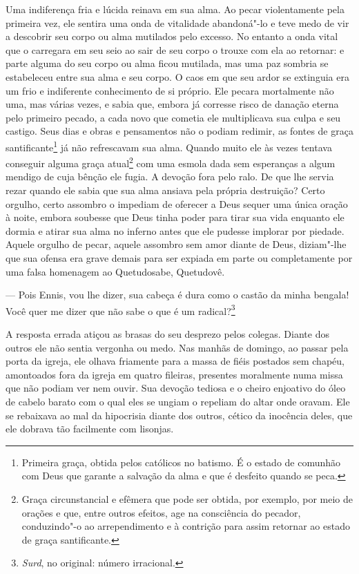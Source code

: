Uma indiferença fria e lúcida reinava em sua alma. Ao pecar
violentamente pela primeira vez, ele sentira uma onda de vitalidade
abandoná"-lo e teve medo de vir a descobrir seu corpo ou alma mutilados
pelo excesso. No entanto a onda vital que o carregara em seu seio ao
sair de seu corpo o trouxe com ela ao retornar: e parte alguma do seu
corpo ou alma ficou mutilada, mas uma paz sombria se estabeleceu entre
sua alma e seu corpo. O caos em que seu ardor se extinguia era um frio
e indiferente conhecimento de si próprio. Ele pecara mortalmente não
uma, mas várias vezes, e sabia que, embora já corresse risco de danação
eterna pelo primeiro pecado, a cada novo que cometia ele multiplicava
sua culpa e seu castigo. Seus dias e obras e pensamentos não o podiam
redimir, as fontes de graça santificante\footnote{ Primeira graça,
obtida pelos católicos no batismo. É o estado de comunhão com Deus que
garante a salvação da alma e que é desfeito quando se peca.} já não
refrescavam sua alma. Quando muito ele às vezes tentava conseguir
alguma graça atual\footnote{ Graça circunstancial e efêmera que pode
ser obtida, por exemplo, por meio de orações e que, entre outros
efeitos, age na consciência do pecador, conduzindo"-o ao arrependimento
e à contrição para assim retornar ao estado de graça santificante.} com
uma esmola dada sem esperanças a algum mendigo de cuja bênção ele
fugia. A devoção fora pelo ralo. De que lhe servia rezar quando ele
sabia que sua alma ansiava pela própria destruição? Certo orgulho,
certo assombro o impediam de oferecer a Deus sequer uma única oração à
noite, embora soubesse que Deus tinha poder para tirar sua vida
enquanto ele dormia e atirar sua alma no inferno antes que ele pudesse
implorar por piedade. Aquele orgulho de pecar, aquele assombro sem amor
diante de Deus, diziam"-lhe que sua ofensa era grave demais para ser
expiada em parte ou completamente por uma falsa homenagem ao Quetudosabe, Quetudovê.

 --- Pois Ennis, vou lhe dizer, sua cabeça é dura como o castão da minha bengala! 
 Você quer me dizer que não sabe o que é um radical?\footnote{ \textit{Surd}, no original: número irracional.}

A resposta errada atiçou as brasas do seu desprezo pelos colegas. Diante
dos outros ele não sentia vergonha ou medo. Nas manhãs de domingo, ao
passar pela porta da igreja, ele olhava friamente para a massa de fiéis
postados sem chapéu, amontoados fora da igreja em quatro fileiras,
presentes moralmente numa missa que não podiam ver nem ouvir. Sua
devoção tediosa e o cheiro enjoativo do óleo de cabelo barato com o
qual eles se ungiam o repeliam do altar onde oravam. Ele se rebaixava
ao mal da hipocrisia diante dos outros, cético da inocência deles, que
ele dobrava tão facilmente com lisonjas.

